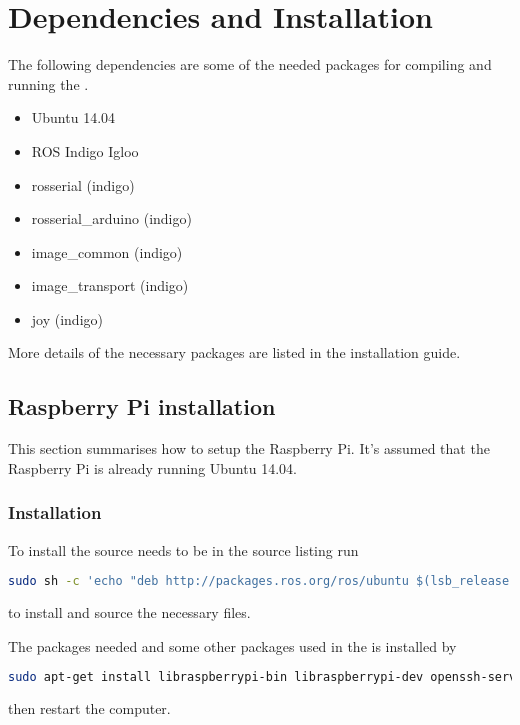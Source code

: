 \chapter{Dependencies and Installation}\label{app:dependencies}
The following dependencies are some of the needed packages for compiling and running the \abbrROV.
\begin{itemize}
    \item Ubuntu 14.04
    \item ROS Indigo Igloo
    \item rosserial (indigo)
    \item rosserial\_arduino (indigo)
    \item image\_common (indigo) 
    \item image\_transport (indigo)
    \item joy (indigo)
\end{itemize}

More details of the necessary packages are listed in the installation guide.

\section{Raspberry Pi installation}
This section summarises how to setup the Raspberry Pi. It's assumed that the Raspberry Pi is already running Ubuntu 14.04.

\subsection{\abbrROS Installation}
To install \abbrROS the \abbrROS source needs to be in the source listing run

\begin{lstlisting}[language=bash]
sudo sh -c 'echo "deb http://packages.ros.org/ros/ubuntu $(lsb_release -sc) main" > /etc/apt/sources.list.d/ros-latest.list' && sudo apt-get install ros-indigo-ros-base -y && sudo rosdep init && rosdep update && echo "source /opt/ros/indigo/setup.bash" >> ~/.bashrc && source ~/.bashrc && sudo apt-get upgrade -y && sudo ln -s /usr /opt/vc
\end{lstlisting}
to install \abbrROS and source the necessary files.

The packages needed and some other packages used in the \abbrROV is installed by
\begin{lstlisting}[language=bash]
sudo apt-get install libraspberrypi-bin libraspberrypi-dev openssh-server build-essential avahi-daemon linux-firmware python-rosinstall ros-indigo-rosserial ros-indigo-rosserial-arduino ros-indigo-image-common ros-indigo-image-transport-plugins git && sudo sh -c 'echo "start_x=1\ngpu_mem=128" >> /boot/config.txt'
\end{lstlisting}
then restart the computer.

